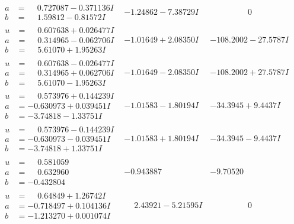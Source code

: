 \documentclass[1p]{elsarticle_modified}
\theoremstyle{definition}
\begin{document}
$$\begin{array}{c|c|c}
\begin{aligned}
a &= \phantom{-}0.727087 - 0.371136 I \\
b &= \phantom{-}1.59812 - 0.81572 I\end{aligned}
 & -1.24862 - 7.38729 I & \phantom{-0.000000 } 0 \\ \hline\begin{aligned}
u &= \phantom{-}0.607638 + 0.026477 I \\
a &= \phantom{-}0.314965 - 0.062706 I \\
b &= \phantom{-}5.61070 + 1.95263 I\end{aligned}
 & -1.01649 + 2.08350 I & -108.2002 - 27.5787 I \\ \hline\begin{aligned}
u &= \phantom{-}0.607638 - 0.026477 I \\
a &= \phantom{-}0.314965 + 0.062706 I \\
b &= \phantom{-}5.61070 - 1.95263 I\end{aligned}
 & -1.01649 - 2.08350 I & -108.2002 + 27.5787 I \\ \hline\begin{aligned}
u &= \phantom{-}0.573976 + 0.144239 I \\
a &= -0.630973 + 0.039451 I \\
b &= -3.74818 - 1.33751 I\end{aligned}
 & -1.01583 - 1.80194 I & -34.3945 + 9.4437 I \\ \hline\begin{aligned}
u &= \phantom{-}0.573976 - 0.144239 I \\
a &= -0.630973 - 0.039451 I \\
b &= -3.74818 + 1.33751 I\end{aligned}
 & -1.01583 + 1.80194 I & -34.3945 - 9.4437 I \\ \hline\begin{aligned}
u &= \phantom{-}0.581059\phantom{ +0.000000I} \\
a &= \phantom{-}0.632960\phantom{ +0.000000I} \\
b &= -0.432804\phantom{ +0.000000I}\end{aligned}
 & -0.943887\phantom{ +0.000000I} & -9.70520\phantom{ +0.000000I} \\ \hline\begin{aligned}
u &= \phantom{-}0.64849 + 1.26742 I \\
a &= -0.718497 + 0.104136 I \\
b &= -1.213270 + 0.001074 I\end{aligned}
 & \phantom{-}2.43921 - 5.21595 I & \phantom{-0.000000 } 0 \\ \hline\begin{aligned}

\end{aligned}
\end{array}$$
\end{document}
